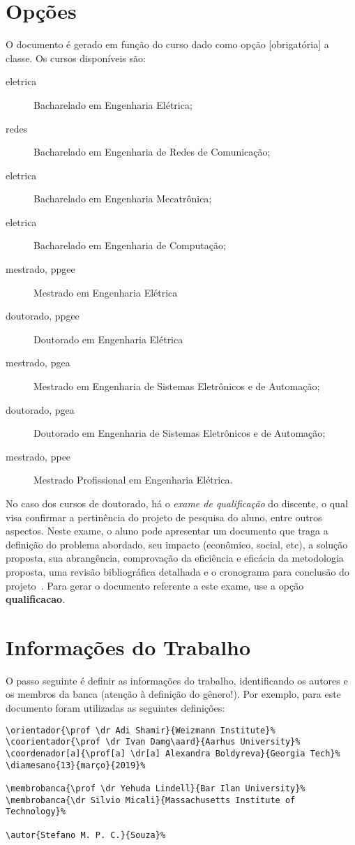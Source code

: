 \section{Opções}
O documento é gerado em função do curso dado como opção [obrigatória] a classe. Os cursos 
disponíveis são:
\begin{description}
	\item[eletrica] Bacharelado em Engenharia Elétrica;
	\item[redes] Bacharelado em Engenharia de Redes de Comunicação;
	\item[eletrica] Bacharelado em Engenharia Mecatrônica;
	\item[eletrica] Bacharelado em Engenharia de Computação;
	\item[mestrado, ppgee] Mestrado em Engenharia Elétrica
	\item[doutorado, ppgee] Doutorado em Engenharia Elétrica
	\item[mestrado, pgea] Mestrado em Engenharia de Sistemas Eletrônicos e de Automação;
	\item[doutorado, pgea] Doutorado em Engenharia de Sistemas Eletrônicos e de Automação;
	\item[mestrado, ppee] Mestrado Profissional em Engenharia Elétrica.
\end{description}

No caso dos cursos de doutorado, há o \emph{exame de qualificação} do discente, o qual visa 
confirmar a pertinência do projeto de pesquisa do aluno, entre outros aspectos. Neste exame, o
aluno pode apresentar um documento que traga a definição do problema abordado, seu impacto 
(econômico, social, etc), a solução proposta, sua abrangência, comprovação da eficiência e eficácia
da metodologia proposta, uma revisão bibliográfica detalhada e o cronograma para conclusão do 
projeto~\cite{ppginf}. Para gerar o documento referente a este exame, use a opção
\textbf{qualificacao}.

\section{Informações do Trabalho}%
O passo seguinte é definir as informações do trabalho, identificando os autores e os membros da 
banca (atenção à definição do gênero!). Por exemplo, para este documento foram utilizadas as 
seguintes definições:

\begin{verbatim}
\orientador{\prof \dr Adi Shamir}{Weizmann Institute}%
\coorientador{\prof \dr Ivan Damg\aard}{Aarhus University}%
\coordenador[a]{\prof[a] \dr[a] Alexandra Boldyreva}{Georgia Tech}%
\diamesano{13}{março}{2019}%

\membrobanca{\prof \dr Yehuda Lindell}{Bar Ilan University}%
\membrobanca{\dr Silvio Micali}{Massachusetts Institute of Technology}%

\autor{Stefano M. P. C.}{Souza}%
\end{verbatim}

